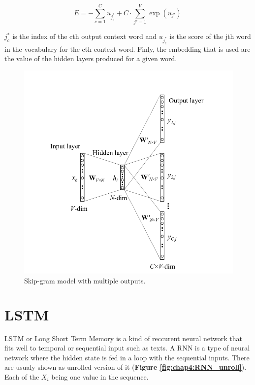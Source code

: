 \begin{equation}
	E = - \sum_{c=1}^C u_{j^*_c} + C \cdot \sum_{j' = 1}^V \exp(u_{j'}) \ \label{eq:loss}
\end{equation}

$j_c^*$ is the index of the cth output context word and $u_{j^*_c}$ is the score of the jth word in the vocabulary for the cth context word. Finly, the embedding that is used are the value of the hidden layers produced for a given word. 

\begin{figure}
	\centering
	\includegraphics[width=\textwidth]{images/chapitre4/skip-gram}
	\caption{Skip-gram model with multiple outputs.}
	\label{fig:chap4:skip-gram}
\end{figure}
\section{LSTM}
LSTM or Long Short Term Memory\cite{Hochreiter1997LongSM} is a kind of reccurent neural network that fits well to temporal or sequential input such as texts. A RNN is a type of neural network where the hidden state is fed in a loop with the sequential inputs. There are usualy shown as unrolled version of it (\textbf{Figure \ref{fig:chap4:RNN_unroll}}). Each of the $X_i$ being one value in the sequence.\\

